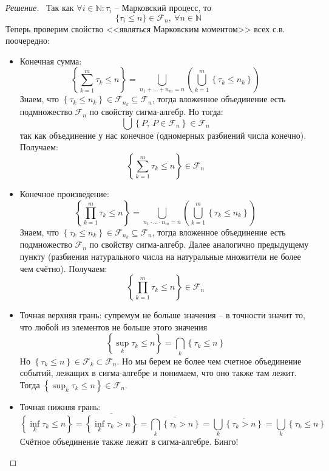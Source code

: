 \documentclass[12pt,a4paper]{extarticle}
\newcommand{\N}{\mathbb{N}}
\newcommand{\filtr}{\mathcal{F}}
\begin{document}
	\begin{proof}[Решение]
		\
		Так как $\forall i \in \N : \tau_i$ -- Марковский процесс, то 
		\[
			\{\tau_i \leq n \} \in \filtr_n, ~\forall n \in \N
		\]
		Теперь проверим свойство <<являться Марковским моментом>> всех с.в. поочередно:
		\begin{itemize}
			\item Конечная сумма:
			\[
				\left\{\sum_{k=1}^{m} \tau_k \leq n \right\} 
				=
				\bigcup_{n_1 + \ldots + n_m = n} \left(\bigcup_{k=1}^m \left\{\tau_k \leq n_k \right\} \right)
			\]
			Знаем, что $\left\{\tau_k \leq n_k \right\} \in \filtr_{n_k} \subseteq \filtr_n$, тогда вложенное объединение есть подмножество $\filtr_n$ по свойству сигма-алгебр. Но тогда:
			\[
				\bigcup \left\{ P, ~P\in \filtr_n \right\} \in \filtr_n 
			\]
			так как объединение у нас конечное (одномерных разбиений числа конечно). 
			Получаем:
			\[
				\left\{\sum_{k=1}^{m} \tau_k \leq n \right\}  \in \filtr_n	
			\]
			
			\item Конечное произведение:
			\[
				\left\{\prod_{k=1}^{m} \tau_k \leq n \right\} 
				=
				\bigcup_{n_1 \cdot \ldots \cdot n_m = n} \left(\bigcup_{k=1}^m \left\{\tau_k \leq n_k \right\} \right)
			\]
			Знаем, что $\left\{\tau_k \leq n_k \right\} \in \filtr_{n_k} \subseteq \filtr_n$, тогда вложенное объединение есть подмножество $\filtr_n$ по свойству сигма-алгебр. 
			Далее аналогично предыдущему пункту (разбиения натурального числа на натуральные множители не более чем счётно).
			Получаем:
			\[
				\left\{\prod_{k=1}^{m} \tau_k \leq n \right\}  \in \filtr_n	
			\]
			
			\item Точная верхняя грань: супремум не больше значения -- в точности значит то, что любой из элементов не больше этого значения
			\[
				\left\{\sup _{k} \tau_{k} \leq n \right\} 
				=
				\bigcap_{k} \left\{\tau_k \leq n \right\}
			\]	
			Но $\left\{\tau_k \leq n \right\} \in \filtr_k \subset \filtr_n$. Но мы берем не более чем счетное объединение событий, лежащих в сигма-алгебре и понимаем, что оно также там лежит. Тогда $\left\{\sup _{k} \tau_{k} \leq n \right\} \in \filtr_n$.
			
			
			\item Точная нижняя грань:
			\[
				\left\{\inf _{k} \tau_{k} \leq n \right\} 
				=
				\overline{\left\{\inf _{k} \tau_{k} > n \right\}}
				=
				\overline{\bigcap_{k} \left\{\tau_k > n \right\}}
				=
				\bigcup_{k} \overline{\left\{\tau_k > n \right\}}
				=
				\bigcup_{k} \left\{\tau_k \leq n \right\}
			\]
			Счётное объединение также лежит в сигма-алгебре. Бинго!
		\end{itemize}
		
	\end{proof}
	
\end{document}

